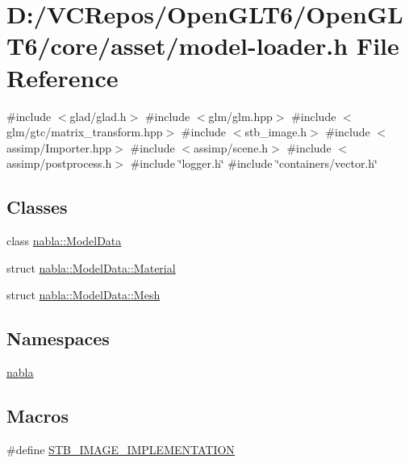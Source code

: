 \hypertarget{model-loader_8h}{}\section{D\+:/\+V\+C\+Repos/\+Open\+G\+L\+T6/\+Open\+G\+L\+T6/core/asset/model-\/loader.h File Reference}
\label{model-loader_8h}
{\ttfamily \#include $<$glad/glad.\+h$>$}\newline
{\ttfamily \#include $<$glm/glm.\+hpp$>$}\newline
{\ttfamily \#include $<$glm/gtc/matrix\+\_\+transform.\+hpp$>$}\newline
{\ttfamily \#include $<$stb\+\_\+image.\+h$>$}\newline
{\ttfamily \#include $<$assimp/\+Importer.\+hpp$>$}\newline
{\ttfamily \#include $<$assimp/scene.\+h$>$}\newline
{\ttfamily \#include $<$assimp/postprocess.\+h$>$}\newline
{\ttfamily \#include \char`\"{}logger.\+h\char`\"{}}\newline
{\ttfamily \#include \char`\"{}containers/vector.\+h\char`\"{}}\newline
\subsection*{Classes}
\begin{DoxyCompactItemize}
\item 
class \mbox{\hyperlink{classnabla_1_1_model_data}{nabla\+::\+Model\+Data}}
\item 
struct \mbox{\hyperlink{structnabla_1_1_model_data_1_1_material}{nabla\+::\+Model\+Data\+::\+Material}}
\item 
struct \mbox{\hyperlink{structnabla_1_1_model_data_1_1_mesh}{nabla\+::\+Model\+Data\+::\+Mesh}}
\end{DoxyCompactItemize}
\subsection*{Namespaces}
\begin{DoxyCompactItemize}
\item 
 \mbox{\hyperlink{namespacenabla}{nabla}}
\end{DoxyCompactItemize}
\subsection*{Macros}
\begin{DoxyCompactItemize}
\item 
\#define \mbox{\hyperlink{model-loader_8h_a18372412ad2fc3ce1e3240b3cf0efe78}{S\+T\+B\+\_\+\+I\+M\+A\+G\+E\+\_\+\+I\+M\+P\+L\+E\+M\+E\+N\+T\+A\+T\+I\+ON}}
\end{DoxyCompactItemize}


